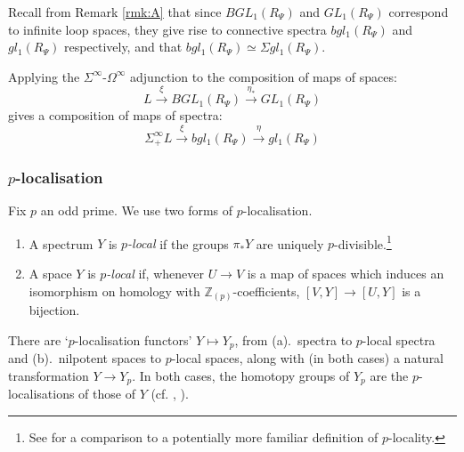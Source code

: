 \documentclass{TPmod}
\def\bZ{\mathbb{Z}}
\def\bZ{\mathbb{Z}}
\numberwithin{equation}{section}
\begin{document}
    Recall from Remark \ref{rmk:A} that since $BGL_1(R_\Psi)$ and $GL_1(R_\Psi)$ correspond to infinite loop spaces, they give rise to connective spectra $bgl_1(R_\Psi)$ and $gl_1(R_\Psi)$ respectively, and that $bgl_1(R_\Psi) \simeq \Sigma gl_1(R_\Psi)$. 

    Applying the $\Sigma^\infty$-$\Omega^\infty$ adjunction to the composition of maps of spaces:
    \begin{equation}
        L \xrightarrow{\xi} BGL_1(R_\Psi) \xrightarrow{\eta_*} GL_1(R_\Psi)
    \end{equation}
    gives a composition of maps of spectra:
    \begin{equation}
        \Sigma^\infty_+ L \xrightarrow{\xi} bgl_1(R_\Psi) \xrightarrow{\eta} gl_1(R_\Psi)
    \end{equation}

    
\subsubsection*{$p$-localisation}
    Fix $p$ an odd prime. We use two forms of $p$-localisation.
    \begin{enumerate}
        \item A spectrum $Y$ is \emph{$p$-local} if the groups $\pi_*Y$ are uniquely $p$-divisible.\footnote{See \cite[Proposition 2.4]{Bousfield:localisation} for a comparison to a potentially more familiar definition of $p$-locality.}

        \item A space $Y$ is \emph{$p$-local} if, whenever $U \to V$ is a map of spaces which induces an isomorphism on homology with $\bZ_{(p)}$-coefficients, $[V, Y] \to [U, Y]$ is a bijection.
    \end{enumerate}
    There are `$p$-localisation functors' $Y \mapsto Y_p$, from (a).~spectra to $p$-local spectra and (b).~nilpotent spaces to $p$-local spaces, along with (in both cases) a natural transformation $Y \to Y_p$. In both cases, the homotopy groups of $Y_p$ are the $p$-localisations of those of $Y$ (cf. \cite[Section 2]{Bousfield:localisation}, \cite[Theorem 6.1.2]{May-Ponto}). 
    
\end{document}
